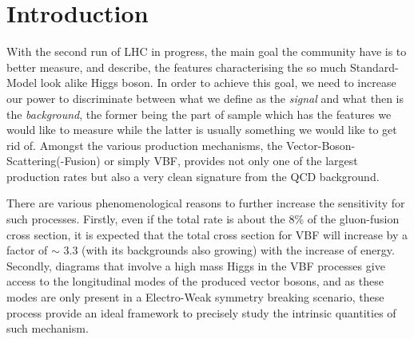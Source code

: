 \section{Introduction } 
With the second run of LHC in progress, the main goal the community have is to
better measure, and describe, the features characterising the so much Standard-Model
look alike Higgs boson. In order to achieve this goal, we need to increase our power
to discriminate between what we define as the {\it signal} and what then is the {\it background}, the former being the part of sample which has the features we would like to measure while the latter is usually something we would like to get rid of.
Amongst the various production mechanisms, the Vector-Boson-Scattering(-Fusion) or simply VBF, provides not only one of the largest production rates but also a very clean signature from the QCD background.

There are various phenomenological reasons to further increase the sensitivity for such processes. Firstly, even if the total rate is about the 8\% of the gluon-fusion cross section, it is expected
that the total cross section for VBF will increase by a factor of $\sim$ 3.3 (with its backgrounds also growing) with the increase of energy. Secondly, diagrams that involve a high mass Higgs in the VBF processes give access to the longitudinal modes of the produced vector bosons, and as these modes are only present in a Electro-Weak symmetry breaking scenario, these process provide an ideal framework to precisely study the intrinsic quantities of such mechanism.

